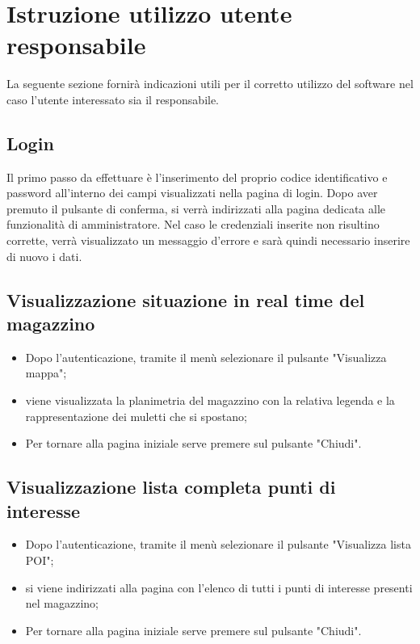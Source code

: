 \section{Istruzione utilizzo utente responsabile}

La seguente sezione fornirà indicazioni utili per il corretto utilizzo del software nel caso l'utente interessato sia il responsabile.

\subsection{Login}
Il primo passo da effettuare è l'inserimento del proprio codice identificativo e password all'interno dei campi visualizzati nella pagina di login. Dopo aver premuto il pulsante di conferma, si verrà indirizzati alla pagina dedicata alle funzionalità di amministratore. Nel caso le credenziali inserite non risultino corrette, verrà visualizzato un messaggio d'errore e sarà quindi necessario inserire di nuovo i dati.

\subsection{Visualizzazione situazione in real time del magazzino}
\begin{itemize}
    \item Dopo l'autenticazione, tramite il menù selezionare il pulsante "Visualizza mappa";
    \item viene visualizzata la planimetria del magazzino con la relativa legenda e la rappresentazione dei muletti che si spostano;
    \item Per tornare alla pagina iniziale serve premere sul pulsante "Chiudi".
\end{itemize}
\subsection{Visualizzazione lista completa punti di interesse}
\begin{itemize}
    \item Dopo l'autenticazione, tramite il menù selezionare il pulsante "Visualizza lista POI";
    \item si viene indirizzati alla pagina con l'elenco di tutti i punti di interesse presenti nel magazzino;
    \item Per tornare alla pagina iniziale serve premere sul pulsante "Chiudi".
\end{itemize}
